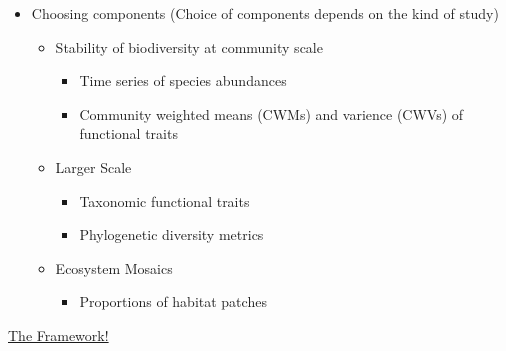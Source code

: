 \begin{itemize}
\begin{itemize}
	\end{itemize} 
	\item Choosing components (Choice of components depends on the kind of study)
	\begin{itemize}
		\item Stability of biodiversity at community scale
		\begin{itemize}
			\item Time series of species abundances
			\item Community weighted means (CWMs) and varience (CWVs) of functional traits
		\end{itemize}
		\item Larger Scale
		\begin{itemize}
			\item Taxonomic functional traits
			\item Phylogenetic diversity metrics
		\end{itemize}
		\item Ecosystem Mosaics
		\begin{itemize}
			\item Proportions of habitat patches
		\end{itemize}
	\end{itemize}
\end{itemize}
\underline{The Framework!}
